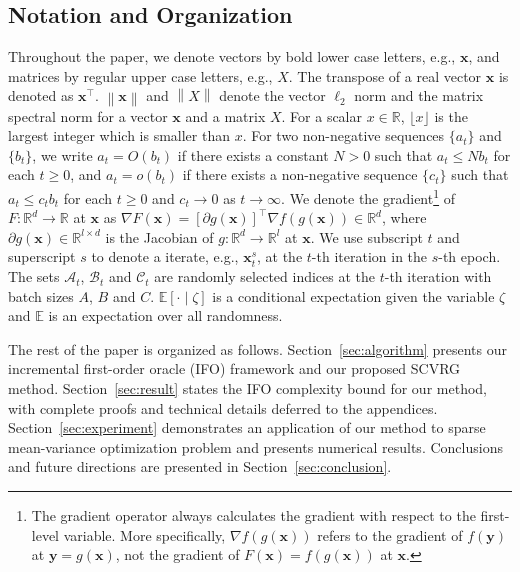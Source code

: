 \documentclass[11pt]{article}
\newcommand{\BE}{\mathbb{E}}
\newcommand{\x}{\mathbf x}
\newcommand{\y}{\mathbf y}
\newcommand{\CCal}{\mathcal{C}}
\newcommand{\br}{\mathbb{R}}
\newcommand{\ACal}{\mathcal{A}}
\newcommand{\BCal}{\mathcal{B}}
\begin{document}
\subsection{Notation and Organization}
Throughout the paper, we denote vectors by bold lower case letters, e.g., $\x$, and matrices by regular upper case letters, e.g., $X$. The transpose of a real vector $\x$ is denoted as $\x^\top$. $\left\|\x\right\|$ and $\left\|X\right\|$ denote the vector $\ell_2$ norm and the matrix spectral norm for a vector $\x$ and a matrix $X$. For a scalar $x\in\br$, $\lfloor x \rfloor$ is the largest integer which is smaller than $x$. For two non-negative sequences $\{a_t\}$ and $\{b_t\}$, we write $a_t=O(b_t)$ if there exists a constant $N>0$ such that $a_t\leq N b_t$ for each $t\geq 0$, and $a_t=o(b_t)$ if there exists a non-negative sequence $\{c_t\}$ such that $a_t\leq c_t b_t$ for each $t\geq 0$ and $c_t\rightarrow 0$ as $t\rightarrow\infty$. We denote the gradient\footnote{The gradient operator always calculates the gradient with respect to the first-level variable. More specifically, $\nabla f(g(\x))$ refers to the gradient of $f(\y)$ at $\y=g(\x)$, not the gradient of $F(\x)=f(g(\x))$ at $\x$.} of $F:\br^d\rightarrow\br$ at $\x$ as $\nabla F(\x)=[\partial g(\x)]^\top\nabla f(g(\x))\in\br^d$, where $\partial g(\x)\in \br^{l\times d}$ is the Jacobian of $g:\br^d\rightarrow\br^l$ at $\x$. We use subscript $t$ and superscript $s$ to denote a iterate, e.g., $\x_t^s$, at the $t$-th iteration in the $s$-th epoch. The sets $\ACal_t$, $\BCal_t$ and $\CCal_t$ are randomly selected indices at the $t$-th iteration with batch sizes $A$, $B$ and $C$. $\BE\left[\cdot\mid\zeta\right]$ is a conditional expectation given the variable $\zeta$ and $\BE$ is an expectation over all randomness.

The rest of the paper is organized as follows. Section~\ref{sec:algorithm} presents our incremental first-order oracle (IFO) framework and our proposed SCVRG method. Section~\ref{sec:result} states the IFO complexity bound for our method, with complete proofs and technical details deferred to the appendices. Section~\ref{sec:experiment} demonstrates an application of our method to sparse mean-variance optimization problem and presents numerical results. Conclusions and future directions are presented in Section~\ref{sec:conclusion}. 
\end{document}
